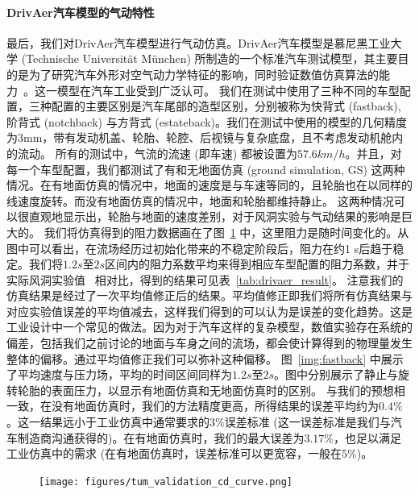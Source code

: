 \paragraph{DrivAer汽车模型的气动特性}
最后，我们对DrivAer汽车模型进行气动仿真。DrivAer汽车模型是慕尼黑工业大学 (Technische Universit\"at M\"unchen) 所制造的一个标准汽车测试模型，其主要目的是为了研究汽车外形对空气动力学特征的影响，同时验证数值仿真算法的能力~\cite{Heft-2011, Heft-2012}。这一模型在汽车工业受到广泛认可。
我们在测试中使用了三种不同的车型配置，三种配置的主要区别是汽车尾部的造型区别，分别被称为快背式 (fastback), 阶背式 (notchback) 与方背式 (estateback)。我们在测试中使用的模型的几何精度为3mm，带有发动机盖、轮胎、轮腔、后视镜与复杂底盘，且不考虑发动机舱内的流动。
所有的测试中，气流的流速 (即车速) 都被设置为$57.6 km/h$。并且，对每一个车型配置，我们都测试了有和无地面仿真 (ground simulation, GS) 这两种情况。在有地面仿真的情况中，地面的速度是与车速等同的，且轮胎也在以同样的线速度旋转。而没有地面仿真的情况中，地面和轮胎都维持静止。
这两种情况可以很直观地显示出，轮胎与地面的速度差别，对于风洞实验与气动结果的影响是巨大的。
我们将仿真得到的阻力数据画在了图~\ref{img:tum_validation_cd_curve} 中，这里阻力是随时间变化的。从图中可以看出，在流场经历过初始化带来的不稳定阶段后，阻力在约1 s后趋于稳定。我们将$1.2s$至$2s$区间内的阻力系数平均来得到相应车型配置的阻力系数，并于实际风洞实验值~\cite{Heft-2012b} 相对比，得到的结果可见表~\ref{tab:drivaer_result}。
注意我们的仿真结果是经过了一次平均值修正后的结果。平均值修正即我们将所有仿真结果与对应实验值误差的平均值减去，这样我们得到的可以认为是误差的变化趋势。这是工业设计中一个常见的做法。因为对于汽车这样的复杂模型，数值实验存在系统的偏差，包括我们之前讨论的地面与车身之间的流场，都会使计算得到的物理量发生整体的偏移。通过平均值修正我们可以弥补这种偏移。
图~\ref{img:fastback} 中展示了平均速度与压力场，平均的时间区间同样为$1.2s$至$2s$。图中分别展示了静止与旋转轮胎的表面压力，以显示有地面仿真和无地面仿真时的区别。
与我们的预想相一致，在没有地面仿真时，我们的方法精度更高，所得结果的误差平均约为$0.4\%$。这一结果远小于工业仿真中通常要求的$3\%$误差标准 (这一误差标准是我们与汽车制造商沟通获得的)。在有地面仿真时，我们的最大误差为$3.17\%$，也足以满足工业仿真中的需求 (在有地面仿真时，误差标准可以更宽容，一般在$5\%$)。

\begin{figure}[htb]
  \centering
    \texttt{[image: figures/tum\_validation\_cd\_curve.png]}
  \label{img:tum_validation_cd_curve}
\end{figure}


